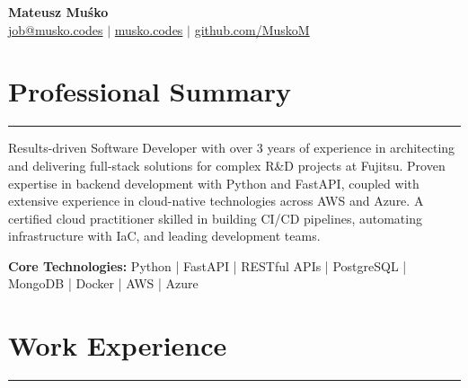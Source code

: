 \documentclass[10pt, a4paper]{article} %
\begin{document}
\begin{center}
    {\Huge \textbf{Mateusz Muśko}} \\
    \vspace{0.1cm}
    \href{mailto:job@musko.codes}{job@musko.codes} $|$
    \href{https://musko.codes}{musko.codes} $|$
    \href{https://github.com/MuskoM}{github.com/MuskoM} \\
\end{center}
\vspace{0.5cm}

\section*{Professional Summary}
\hrule
\vspace{0.2cm}
Results-driven Software Developer with over 3 years of experience in architecting and delivering full-stack solutions for complex R\&D projects at Fujitsu. Proven expertise in backend development with Python and FastAPI, coupled with extensive experience in cloud-native technologies across AWS and Azure. A certified cloud practitioner skilled in building CI/CD pipelines, automating infrastructure with IaC, and leading development teams.
\vspace{0.3cm}

\textbf{Core Technologies:} Python | FastAPI | RESTful APIs | PostgreSQL | MongoDB | Docker | AWS | Azure

\vspace{0.5cm}

\section*{Work Experience}
\hrule
\end{document}
